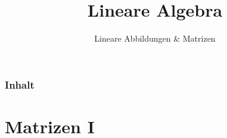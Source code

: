 

\title{Lineare Algebra}
\subtitle{Lineare Abbildungen \& Matrizen}



\makeTitlePage

\begin{frame}\frametitle{Inhalt}
   \tableofcontents
\end{frame}
%

%
\section{Matrizen I}
\makeSectionDividerPage
%
